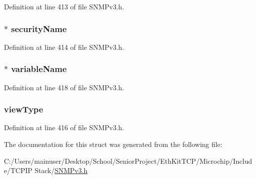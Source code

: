 Definition at line 413 of file S\+N\+M\+Pv3.\+h.

\hypertarget{struct_access_ctrl_sub_sys_is_access_allowed_a4a48a8746988a1f761c3e9eadcc20463}{}
\subsubsection[{security\+Name}]{$\ast$ security\+Name}\label{struct_access_ctrl_sub_sys_is_access_allowed_a4a48a8746988a1f761c3e9eadcc20463}


Definition at line 414 of file S\+N\+M\+Pv3.\+h.

\hypertarget{struct_access_ctrl_sub_sys_is_access_allowed_a65f4f9825a516d82460aee835aac4c9a}{}
\subsubsection[{variable\+Name}]{$\ast$ variable\+Name}\label{struct_access_ctrl_sub_sys_is_access_allowed_a65f4f9825a516d82460aee835aac4c9a}


Definition at line 418 of file S\+N\+M\+Pv3.\+h.

\hypertarget{struct_access_ctrl_sub_sys_is_access_allowed_add1bbedb5b5e570f44f7da6aa5f3d2e4}{}
\subsubsection[{view\+Type}]{ view\+Type}\label{struct_access_ctrl_sub_sys_is_access_allowed_add1bbedb5b5e570f44f7da6aa5f3d2e4}


Definition at line 416 of file S\+N\+M\+Pv3.\+h.



The documentation for this struct was generated from the following file\+:\begin{DoxyCompactItemize}
\item 
C\+:/\+Users/mainuser/\+Desktop/\+School/\+Senior\+Project/\+Eth\+Kit\+T\+C\+P/\+Microchip/\+Include/\+T\+C\+P\+I\+P Stack/\hyperlink{_s_n_m_pv3_8h}{S\+N\+M\+Pv3.\+h}\end{DoxyCompactItemize}
